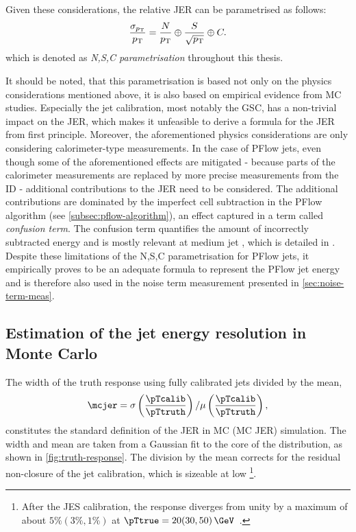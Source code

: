 Given these considerations, the relative JER can be parametrised as follows:
\begin{equation}
    \label{eq:jer-parametrisation}
    \frac{\sigma_{p_{\rm T}}}{p_{\rm T}} = \frac{N}{p_{\rm T}} \oplus \frac{S}{\sqrt{p_{\rm T}}} \oplus C.
\end{equation}
which is denoted as \emph{N,S,C parametrisation} throughout this thesis.


It should be noted, that this parametrisation is based not only on the physics considerations mentioned above, it is also based on empirical evidence from MC studies. Especially the jet calibration, most notably the GSC, has a non-trivial impact on the JER, which makes it unfeasible to derive a formula for the JER from first principle. 
Moreover, the aforementioned physics considerations are only considering calorimeter-type measurements. In the case of PFlow jets, even though some of the aforementioned effects are mitigated - because parts of the calorimeter measurements are replaced by more precise measurements from the ID - additional contributions to the JER need to be considered. The additional contributions are dominated by the imperfect cell subtraction in the PFlow algorithm (see \cref{subsec:pflow-algorithm}), an effect captured in a term called \emph{confusion term}. The confusion term quantifies the amount of incorrectly subtracted energy and is mostly relevant at medium jet \pT, which is detailed in .
Despite these limitations of the N,S,C parametrisation for PFlow jets, it empirically proves to be an adequate formula to represent the PFlow jet energy and is therefore also used in the noise term measurement presented in \cref{sec:noise-term-meas}. 




\subsection{Estimation of the jet energy resolution in Monte Carlo}
The width of the truth response using fully calibrated jets  divided by the mean,
\begin{equation}
    \mcjer = \sigma \left( \frac{\pTcalib}{\pTtruth} \right) / \mu \left( \frac{\pTcalib}{\pTtruth} \right),
\end{equation}
constitutes the standard definition of the JER in MC (MC JER) simulation. 
The width and mean are taken from a Gaussian fit to the core of the distribution, as shown in \cref{fig:truth-response}. The division by the mean corrects for the residual non-closure of the jet calibration, which is sizeable at low \pT\footnote{After the JES calibration, the response diverges from unity by a maximum of about $5\% (3\%, 1\%)$ at $\pTtrue = 20 (30, 50)\,\GeV$~\cite{JETM-2018-05}.}.

